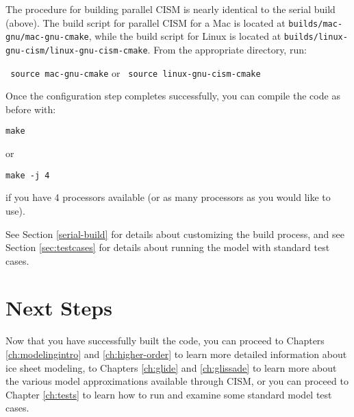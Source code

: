 The procedure for building parallel CISM is nearly identical to the serial build (above).
The build script for parallel CISM for a Mac is located at \texttt{builds/mac-gnu/mac-gnu-cmake}, 
while the build script for Linux is located at \texttt{builds/linux-gnu-cism/linux-gnu-cism-cmake}.
From the appropriate directory, run:

\texttt{ source mac-gnu-cmake} or \texttt{ source linux-gnu-cism-cmake}

Once the configuration step completes successfully, you can compile the code as before with:

\texttt{make}

or

\texttt{make -j 4}

if you have 4 processors available (or as many processors as you would like to use).

See Section \ref{serial-build} for details about customizing the build process, and 
see Section \ref{sec:testcases} for details about running the model with standard
test cases.


\section{Next Steps}

Now that you have successfully built the code, you can proceed to Chapters \ref{ch:modelingintro} and \ref{ch:higher-order} to learn more detailed 
information about ice sheet modeling, to Chapters \ref{ch:glide} and \ref{ch:glissade} to learn more about the various model approximations 
available through CISM, or you can proceed to Chapter \ref{ch:tests} to learn how to run and examine some standard model test cases.  



